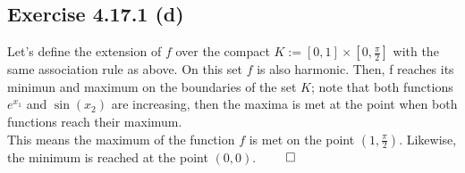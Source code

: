 \documentclass{exam}
\renewenvironment{proof}{{\noindent\itshape\ignorespaces}}{{\hfill$\qed$\\}}
\begin{document}
\subsection*{Exercise 4.17.1 (d)}
\begin{proof}
    Let's define the extension of $f$ over the compact $K := [0,1] \times [0, \frac{\pi}{2}]$ with the same association rule as above. On this set $f$ is also harmonic. Then, 
    f reaches its minimun and maximum  on the boundaries of the set $K$; note that both functions $e^{x_1}$ and $\sin(x_2)$ are increasing, then the maxima is met at the point when both functions
    reach their maximum. \\
    
    \noindent This means the maximum of the function $f$ is met on the point $(1,\frac{\pi}{2})$. Likewise, the minimum is reached at the point $(0,0)$.
\end{proof}
\end{document}
